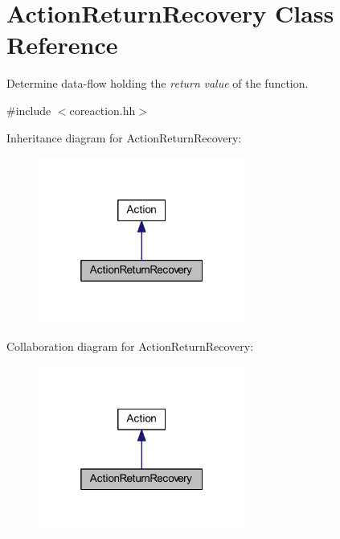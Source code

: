 \hypertarget{class_action_return_recovery}{}\section{Action\+Return\+Recovery Class Reference}
\label{class_action_return_recovery}


Determine data-\/flow holding the {\itshape return} {\itshape value} of the function.  




{\ttfamily \#include $<$coreaction.\+hh$>$}



Inheritance diagram for Action\+Return\+Recovery\+:
\nopagebreak
\begin{figure}[H]
\begin{center}
\leavevmode
\includegraphics[width=193pt]{class_action_return_recovery__inherit__graph}
\end{center}
\end{figure}


Collaboration diagram for Action\+Return\+Recovery\+:
\nopagebreak
\begin{figure}[H]
\begin{center}
\leavevmode
\includegraphics[width=193pt]{class_action_return_recovery__coll__graph}
\end{center}
\end{figure}
